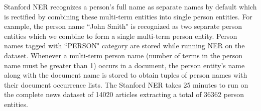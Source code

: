 



 Stanford NER recognizes a person's full name as separate names by default which is rectified by combining these multi-term entities into single person entities. For example, the person name ``John Smith" is recognized as two separate person entities which we combine to form a single multi-term person entity.
Person names tagged with ``PERSON" category are stored while running NER on the dataset.
Whenever a multi-term person name (number of terms in the person name must be greater than 1) occurs in a document, the person entity's name along with the document name is stored to obtain tuples of person names with their document occurrence lists.
The Stanford NER takes 25 minutes to run on the complete news dataset of 14020 articles extracting a total of 36362 person entities.  

